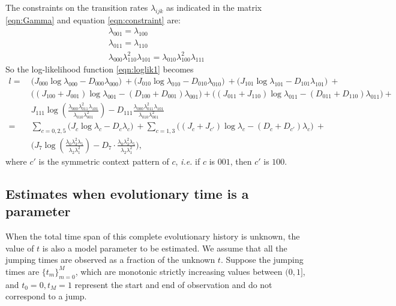 \documentclass[11pt]{article}
\begin{document}
The constraints on the transition rates $\lambda_{ijk}$ as indicated in
the matrix \eqref{eqn:Gamma} and equation \eqref{eqn:constraint} are:
\begin{equation}\label{eqn:constraints}
  \begin{array}{c}
    \lambda_{001} = \lambda_{100}\\
    \lambda_{011} = \lambda_{110}\\
    \lambda_{000}\lambda_{110}^2\lambda_{101} = \lambda_{010}\lambda_{100}^2\lambda_{111}
  \end{array}
\end{equation}
So the log-likelihood function \eqref{eqn:loglik1} becomes
\begin{equation}\label{eqn:loglik2}
  \begin{aligned}
    l = ~ & \bigg(J_{000}\log\lambda_{000} - D_{000}\lambda_{000}\bigg) ~ +
    \bigg(J_{010}\log\lambda_{010} - D_{010}\lambda_{010}\bigg) ~ +
    \bigg(J_{101}\log\lambda_{101} - D_{101}\lambda_{101}\bigg) ~ + \\
    & \bigg( (J_{100} + J_{001})\log\lambda_{001} - (D_{100}+D_{001})\lambda_{001}\bigg) +
    \bigg((J_{011} + J_{110})\log\lambda_{011} - (D_{011}+D_{110})\lambda_{011}\bigg) +  \\
    & J_{111}\log\left(\frac{\lambda_{000}\lambda_{011}^2\lambda_{101}}{\lambda_{010}\lambda_{001}^2}\right) - D_{111}\frac{\lambda_{000}\lambda_{011}^2\lambda_{101}}{\lambda_{010}\lambda_{001}^2} \\
    = ~ & \sum\limits_{c=0,2,5}\bigg(J_c\log\lambda_c - D_c\lambda_c\bigg) ~ +
    \sum\limits_{c=1,3} \bigg((J_c + J_{c'})\log\lambda_c - (D_c + D_{c'})\lambda_c\bigg) ~ + \\
    ~ & \bigg(J_7\log(\frac{\lambda_0\lambda_3^2\lambda_5}{\lambda_2\lambda_1^2})
    - D_7\cdot\frac{\lambda_0\lambda_3^2\lambda_5}{\lambda_2\lambda_1^2} \bigg),
  \end{aligned}
\end{equation}
where $c'$ is the symmetric context pattern of $c$, \textit{i.e.} if
$c$ is $001$, then $c'$ is $100$.

\subsection{Estimates when evolutionary time is a parameter}
When the total time span of this complete evolutionary history is
unknown, the value of $t$ is also a model parameter to be
estimated. We assume that all the jumping times are observed as a
fraction of the unknown $t$. Suppose the jumping times are
$\{t_m\}_{m=0}^M$, which are monotonic strictly increasing values
between $(0,1]$, and $t_0 = 0, t_M = 1$ represent the start
and end of observation and do not correspond to a jump. 
\end{document}
